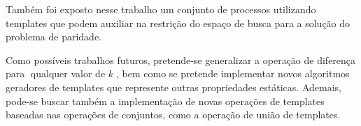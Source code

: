 Também foi exposto nesse trabalho um conjunto de processos utilizando templates que podem auxiliar na restrição do espaço de busca para a solução do problema de paridade.

Como possíveis trabalhos futuros, pretende-se generalizar a operação de diferença para qualquer valor de $k$, bem como se pretende implementar novos algoritmos geradores de templates que represente outras propriedades estáticas. Ademais, pode-se buscar também a implementação de novas operações de templates baseadas nas operações de conjuntos, como a operação de união de templates.
